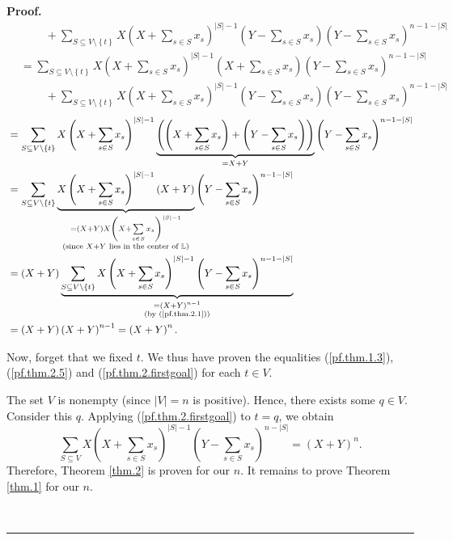 \documentclass[numbers=enddot,12pt,final,onecolumn,notitlepage]{scrartcl}%
\theoremstyle{definition}
\newenvironment{proof}[1][Proof]{\noindent\textbf{#1.} }{\ \rule{0.5em}{0.5em}}
\let\sumnonlimits\sum
\renewcommand{\sum}{\sumnonlimits\limits}
\newenvironment{vershort}{}{}
\begin{document}
\begin{vershort}
\begin{proof}
\begin{align*}
&  \ \ \ \ \ \ \ \ \ \ +\sum_{S\subseteq V\setminus\left\{  t\right\}
}X\left(  X+\sum_{s\in S}x_{s}\right)  ^{\left\vert S\right\vert -1}\left(
Y-\sum_{s\in S}x_{s}\right)  \left(  Y-\sum_{s\in S}x_{s}\right)
^{n-1-\left\vert S\right\vert }\\
&  =\sum_{S\subseteq V\setminus\left\{  t\right\}  }X\left(  X+\sum_{s\in
S}x_{s}\right)  ^{\left\vert S\right\vert -1}\left(  X+\sum_{s\in S}%
x_{s}\right)  \left(  Y-\sum_{s\in S}x_{s}\right)  ^{n-1-\left\vert
S\right\vert }\\
&  \ \ \ \ \ \ \ \ \ \ +\sum_{S\subseteq V\setminus\left\{  t\right\}
}X\left(  X+\sum_{s\in S}x_{s}\right)  ^{\left\vert S\right\vert -1}\left(
Y-\sum_{s\in S}x_{s}\right)  \left(  Y-\sum_{s\in S}x_{s}\right)
^{n-1-\left\vert S\right\vert }%
\end{align*}%
\begin{align}
&  =\sum_{S\subseteq V\setminus\left\{  t\right\}  }X\left(  X+\sum_{s\in
S}x_{s}\right)  ^{\left\vert S\right\vert -1}\underbrace{\left(  \left(
X+\sum_{s\in S}x_{s}\right)  +\left(  Y-\sum_{s\in S}x_{s}\right)  \right)
}_{=X+Y}\left(  Y-\sum_{s\in S}x_{s}\right)  ^{n-1-\left\vert S\right\vert
}\nonumber\\
&  =\sum_{S\subseteq V\setminus\left\{  t\right\}  }\underbrace{X\left(
X+\sum_{s\in S}x_{s}\right)  ^{\left\vert S\right\vert -1}\left(  X+Y\right)
}_{\substack{=\left(  X+Y\right)  X\left(  X+\sum_{s\in S}x_{s}\right)
^{\left\vert S\right\vert -1}\\\text{(since }X+Y\text{ lies in the center of
}\mathbb{L}\text{)}}}\left(  Y-\sum_{s\in S}x_{s}\right)  ^{n-1-\left\vert
S\right\vert }\nonumber\\
&  =\left(  X+Y\right)  \underbrace{\sum_{S\subseteq V\setminus\left\{
t\right\}  }X\left(  X+\sum_{s\in S}x_{s}\right)  ^{\left\vert S\right\vert
-1}\left(  Y-\sum_{s\in S}x_{s}\right)  ^{n-1-\left\vert S\right\vert }%
}_{\substack{=\left(  X+Y\right)  ^{n-1}\\\text{(by (\ref{pf.thm.2.1}))}%
}}\nonumber\\
&  =\left(  X+Y\right)  \left(  X+Y\right)  ^{n-1}=\left(  X+Y\right)  ^{n}.
\label{pf.thm.2.firstgoal}%
\end{align}


Now, forget that we fixed $t$. We thus have proven the equalities
(\ref{pf.thm.1.3}), (\ref{pf.thm.2.5}) and (\ref{pf.thm.2.firstgoal}) for each
$t\in V$.

The set $V$ is nonempty (since $\left\vert V\right\vert =n$ is positive).
Hence, there exists some $q\in V$. Consider this $q$. Applying
(\ref{pf.thm.2.firstgoal}) to $t=q$, we obtain%
\begin{equation}
\sum_{S\subseteq V}X\left(  X+\sum_{s\in S}x_{s}\right)  ^{\left\vert
S\right\vert -1}\left(  Y-\sum_{s\in S}x_{s}\right)  ^{n-\left\vert
S\right\vert }=\left(  X+Y\right)  ^{n}. \label{pf.thm.2.firstgoal'}%
\end{equation}
Therefore, Theorem \ref{thm.2} is proven for our $n$. It remains to prove
Theorem \ref{thm.1} for our $n$.


\end{proof}
\end{vershort}
\end{document}
